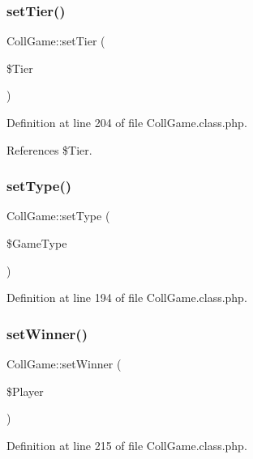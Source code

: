 \subsubsection{\texorpdfstring{set\+Tier()}{setTier()}}
{\footnotesize\ttfamily Coll\+Game\+::set\+Tier (\begin{DoxyParamCaption}\item[{}]{\$\+Tier }\end{DoxyParamCaption})}



Definition at line 204 of file Coll\+Game.\+class.\+php.



References \$\+Tier.

\mbox{\label{class_coll_game_ae855d409619a2c4393b68a5b5b500a44}} 
\subsubsection{\texorpdfstring{set\+Type()}{setType()}}
{\footnotesize\ttfamily Coll\+Game\+::set\+Type (\begin{DoxyParamCaption}\item[{}]{\$\+Game\+Type }\end{DoxyParamCaption})}



Definition at line 194 of file Coll\+Game.\+class.\+php.

\mbox{\label{class_coll_game_af53c04d2c5319ec17eb544f43eb0fa8f}} 
\subsubsection{\texorpdfstring{set\+Winner()}{setWinner()}}
{\footnotesize\ttfamily Coll\+Game\+::set\+Winner (\begin{DoxyParamCaption}\item[{}]{\$\+Player }\end{DoxyParamCaption})}



Definition at line 215 of file Coll\+Game.\+class.\+php.

\mbox{\label{class_coll_game_ade12acdf0b275118160e3744e8097316}} 
